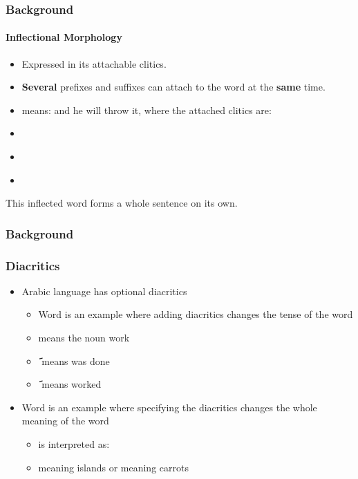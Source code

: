 \documentclass[xcolor=table]{beamer}
\begin{document}
\begin{frame}
\frametitle{Background}
\framesubtitle{Inflectional Morphology}
\begin{itemize}
\item Expressed in its attachable clitics.
\item \textbf{Several} prefixes and suffixes can attach to the word at the \textbf{same} time.
\item \textbf{}
means: and he will throw it, where the attached clitics are:
\item \textbf{}
\item \textbf{}
\item \textbf{}

\end{itemize}
This inflected word forms a whole sentence on its own.

\end{frame}

\begin{frame}[<+->]
\frametitle{Background}
\frametitle{Diacritics}
\begin{itemize}
\item Arabic language has optional diacritics
\begin{itemize}
   \item Word \textbf{} is an example where adding diacritics changes the tense of the word
\item  \textbf{  } means the noun work
\item \textbf{َ} means was done
\item  \textbf{َ} means worked
\end{itemize}

\item Word\textbf{   }is an example where specifying the diacritics changes the whole meaning of the word
\begin{itemize}
    \item \textbf{ }is interpreted as:
    
    \item \textbf{}
meaning islands or \textbf{} meaning carrots
\end{itemize}
\end{itemize}

\end{frame}
\end{document}
